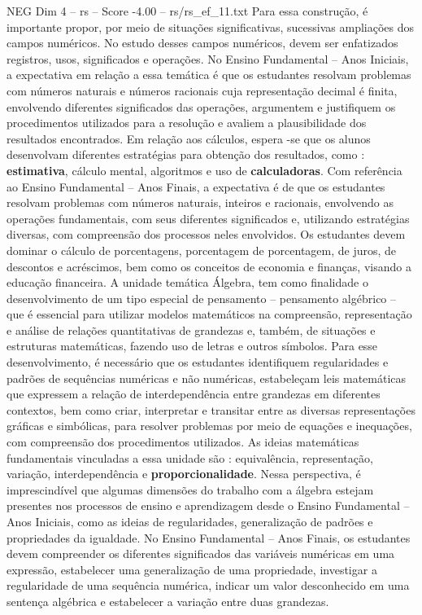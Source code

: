 \begin{textsample}{NEG Dim 4 – rs – Score -4.00 – rs/rs\_ef\_11.txt}
Para essa construção, é importante propor, por meio de situações significativas, sucessivas ampliações dos campos numéricos.
No estudo desses campos numéricos, devem ser enfatizados registros, usos, significados e operações.
No Ensino Fundamental – Anos Iniciais, a expectativa em relação a essa temática é que os estudantes resolvam problemas com números naturais e números racionais cuja representação decimal é finita, envolvendo diferentes significados das operações, argumentem e justifiquem os procedimentos utilizados para a resolução e avaliem a plausibilidade dos resultados encontrados.
Em relação aos cálculos, espera -se que os alunos desenvolvam diferentes estratégias para obtenção dos resultados, como : \textbf{estimativa}, cálculo mental, algoritmos e uso de \textbf{calculadoras}.
Com referência ao Ensino Fundamental – Anos Finais, a expectativa é de que os estudantes resolvam problemas com números naturais, inteiros e racionais, envolvendo as operações fundamentais, com seus diferentes significados e, utilizando estratégias diversas, com compreensão dos processos neles envolvidos.
Os estudantes devem dominar o cálculo de porcentagens, porcentagem de porcentagem, de juros, de descontos e acréscimos, bem como os conceitos de economia e finanças, visando a educação financeira.
A unidade temática Álgebra, tem como finalidade o desenvolvimento de um tipo especial de pensamento – pensamento algébrico – que é essencial para utilizar modelos matemáticos na compreensão, representação e análise de relações quantitativas de grandezas e, também, de situações e estruturas matemáticas, fazendo uso de letras e outros símbolos.
Para esse desenvolvimento, é necessário que os estudantes identifiquem regularidades e padrões de sequências numéricas e não numéricas, estabeleçam leis matemáticas que expressem a relação de interdependência entre grandezas em diferentes contextos, bem como criar, interpretar e transitar entre as diversas representações gráficas e simbólicas, para resolver problemas por meio de equações e inequações, com compreensão dos procedimentos utilizados.
As ideias matemáticas fundamentais vinculadas a essa unidade são : equivalência, representação, variação, interdependência e \textbf{proporcionalidade}.
Nessa perspectiva, é imprescindível que algumas dimensões do trabalho com a álgebra estejam presentes nos processos de ensino e aprendizagem desde o Ensino Fundamental – Anos Iniciais, como as ideias de regularidades, generalização de padrões e propriedades da igualdade.
No Ensino Fundamental – Anos Finais, os estudantes devem compreender os diferentes significados das variáveis numéricas em uma expressão, estabelecer uma generalização de uma propriedade, investigar a regularidade de uma sequência numérica, indicar um valor desconhecido em uma sentença algébrica e estabelecer a variação entre duas grandezas.

\end{textsample}
